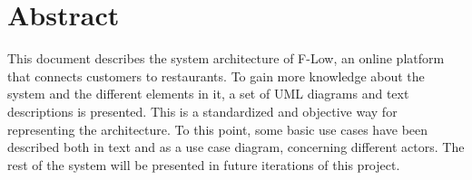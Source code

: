 \section*{Abstract}


This document describes the system architecture of F-Low, an online platform that connects customers to restaurants. To gain more knowledge about the system and the different elements in it, a set of UML diagrams and text descriptions is presented. This is a standardized and objective way for representing the architecture. To this point, some basic use cases have been described both in text and as a use case diagram, concerning different actors. The rest of the system will be presented in future iterations of this project.


